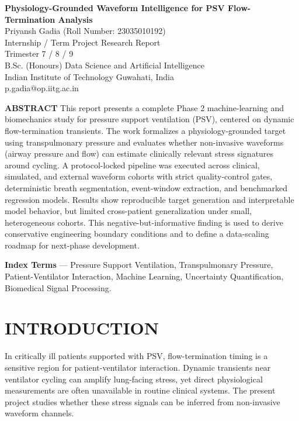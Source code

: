 \documentclass[9pt,twocolumn]{article}
\begin{document}
\begin{center}
{\Large \textbf{Physiology-Grounded Waveform Intelligence for PSV Flow-Termination Analysis}}\\[3pt]
Priyansh Gadia (Roll Number: 23035010192)\\
Internship / Term Project Research Report\\
Trimester 7 / 8 / 9\\
B.Sc. (Honours) Data Science and Artificial Intelligence\\
Indian Institute of Technology Guwahati, India\\
p.gadia@op.iitg.ac.in
\end{center}

\textbf{ABSTRACT} This report presents a complete Phase 2 machine-learning and biomechanics study for pressure support ventilation (PSV), centered on dynamic flow-termination transients. The work formalizes a physiology-grounded target using transpulmonary pressure and evaluates whether non-invasive waveforms (airway pressure and flow) can estimate clinically relevant stress signatures around cycling. A protocol-locked pipeline was executed across clinical, simulated, and external waveform cohorts with strict quality-control gates, deterministic breath segmentation, event-window extraction, and benchmarked regression models. Results show reproducible target generation and interpretable model behavior, but limited cross-patient generalization under small, heterogeneous cohorts. This negative-but-informative finding is used to derive conservative engineering boundary conditions and to define a data-scaling roadmap for next-phase development.

\textbf{Index Terms} --- Pressure Support Ventilation, Transpulmonary Pressure, Patient-Ventilator Interaction, Machine Learning, Uncertainty Quantification, Biomedical Signal Processing.

\section{INTRODUCTION}

In critically ill patients supported with PSV, flow-termination timing is a sensitive region for patient-ventilator interaction. Dynamic transients near ventilator cycling can amplify lung-facing stress, yet direct physiological measurements are often unavailable in routine clinical systems. The present project studies whether these stress signals can be inferred from non-invasive waveform channels.
\end{document}
